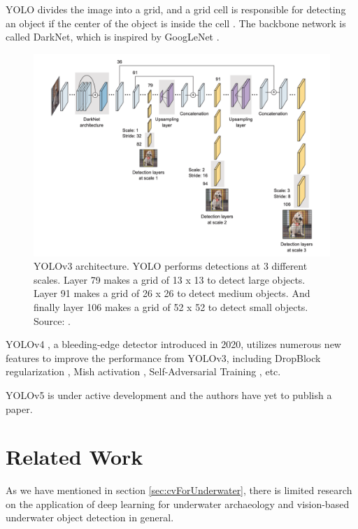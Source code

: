 \documentclass[a4paper, 11pt, oneside]{article}
\begin{document}
YOLO divides the image into a grid, and a grid cell is responsible for detecting an object if the center of the object
is inside the cell \cite{elgendy2020deep, redmon2016you}. The backbone network is called DarkNet, which is inspired by
GoogLeNet \cite{elgendy2020deep, redmon2016you}.

\begin{figure}[ht]
  \begin{center}
    \includegraphics[width=\textwidth]{yolov3.png}
  \end{center}
  \caption{YOLOv3 architecture. YOLO performs detections at 3 different scales. Layer 79 makes a grid of 13 x 13 to
  detect large objects. Layer 91 makes a grid of 26 x 26 to detect medium objects. And finally layer 106 makes a grid
  of 52 x 52 to detect small objects. Source: \cite{elgendy2020deep}.}
\end{figure}

YOLOv4 \cite{bochkovskiy2020yolov4}, a bleeding-edge detector introduced in 2020, utilizes numerous new features to
improve the performance from YOLOv3, including DropBlock regularization \cite{ghiasi2018dropblock}, Mish activation
\cite{misra2019mish}, Self-Adversarial Training \cite{bochkovskiy2020yolov4}, etc.

YOLOv5 \cite{yolov5} is under active development and the authors have yet to publish a paper.

\section{Related Work}

As we have mentioned in section \ref{sec:cvForUnderwater}, there is limited research on the application of deep learning
for underwater archaeology and vision-based underwater object detection in general.
\end{document}
